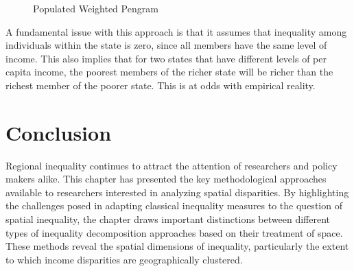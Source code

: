\documentclass[
  a4paper, 
  twoside,
  final
]{article}
\begin{document}
\begin{figure}


\caption{\label{fig-weighted-pengram}Populated Weighted Pengram}

\end{figure}%

A fundamental issue with this approach is that it assumes that
inequality among individuals within the state is zero, since all members
have the same level of income. This also implies that for two states
that have different levels of per capita income, the poorest members of
the richer state will be richer than the richest member of the poorer
state. This is at odds with empirical reality.

\section{Conclusion}\label{conclusion}

Regional inequality continues to attract the attention of researchers
and policy makers alike. This chapter has presented the key
methodological approaches available to researchers interested in
analyzing spatial disparities. By highlighting the challenges posed in
adapting classical inequality measures to the question of spatial
inequality, the chapter draws important distinctions between different
types of inequality decomposition approaches based on their treatment of
space. These methods reveal the spatial dimensions of inequality,
particularly the extent to which income disparities are geographically
clustered.
\end{document}
